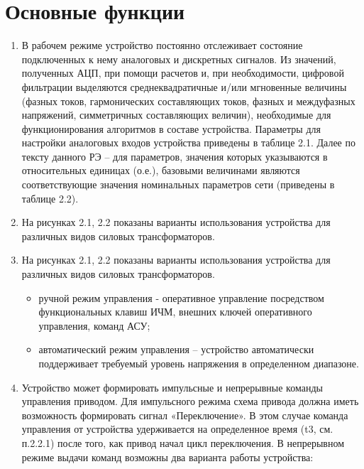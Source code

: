 \color{uniblue}\section[Основные функции]{Основные функции}\label{sec:funcs}
\color{black}

\color{black}

\begin{enumerate}[label=\arabic{section}.\arabic{subsection}.\arabic*, labelsep=4pt, leftmargin=0pt, itemindent=57pt]
    
\item
В рабочем режиме устройство постоянно отслеживает состояние подключенных к нему аналоговых и дискретных сигналов. Из значений, полученных АЦП, при помощи расчетов и, при необходимости, цифровой фильтрации выделяются среднеквадратичные и/или мгновенные величины (фазных токов, гармонических составляющих токов, фазных и междуфазных напряжений, симметричных составляющих величин), необходимые для функционирования алгоритмов в составе устройства. Параметры для настройки аналоговых входов устройства приведены в таблице 2.1. Далее по тексту данного РЭ – для параметров, значения которых указываются в относительных единицах (о.е.), базовыми величинами являются соответствующие значения номинальных параметров сети (приведены в таблице 2.2).
\item
На рисунках 2.1, 2.2 показаны варианты использования устройства для различных видов силовых трансформаторов.
\item
На рисунках 2.1, 2.2 показаны варианты использования устройства для различных видов силовых трансформаторов.
\begin{itemize}
    \item
    ручной режим управления  - оперативное управление посредством функциональных клавиш ИЧМ, внешних ключей оперативного управления, команд АСУ;
    \item
    автоматический режим управления – устройство автоматически поддерживает требуемый уровень напряжения в определенном диапазоне.
\end{itemize}
\item
Устройство может формировать импульсные и непрерывные команды управления приводом. Для импульсного режима схема привода должна иметь возможность формировать сигнал «Переключение». В этом случае команда управления от устройства удерживается на определенное время (t3, см. п.2.2.1) после того, как привод начал цикл переключения. В непрерывном режиме выдачи команд возможны два варианта работы устройства:

\end{enumerate}
